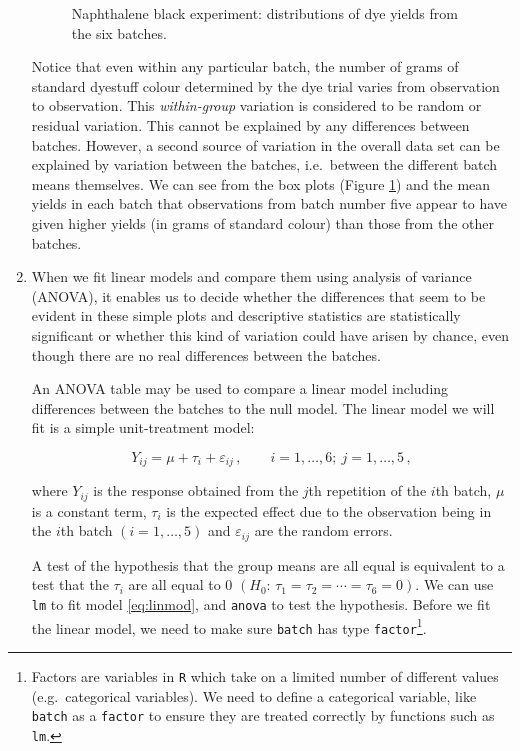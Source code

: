 \documentclass[
]{book}
\theoremstyle{definition}
\theoremstyle{definition}
\theoremstyle{definition}
\theoremstyle{definition}
\theoremstyle{remark}
\begin{document}
\begin{enumerate}
\begin{figure}
{   }

   \caption{Naphthalene black experiment: distributions of dye yields from the six batches.}\label{fig:napblack-summary}
   \end{figure}

  Notice that even within any particular batch, the number of grams of standard dyestuff colour determined by the dye trial varies from observation to observation. This \emph{within-group} variation is considered to be random or residual variation. This cannot be explained by any differences between batches. However, a second source of variation in the overall data set can be explained by variation between the batches, i.e.~between the different batch means themselves. We can see from the box plots (Figure \ref{fig:napblack-summary}) and the mean yields in each batch that observations from batch number five appear to have given higher yields (in grams of standard colour) than those from the other batches.
\item
  When we fit linear models and compare them using analysis of variance (ANOVA), it enables us to decide whether the differences that seem to be evident in these simple plots and descriptive statistics are statistically significant or whether this kind of variation could have arisen by chance, even though there are no real differences between the batches.

  An ANOVA table may be used to compare a linear model including differences between the batches to the null model. The linear model we will fit is a simple unit-treatment model:

  \begin{equation}
   Y_{ij} =  \mu +  \tau_i +  \varepsilon_{ij} \,,\qquad i=1,\ldots,6;~j=1,\ldots,5\,,
   \label{eq:linmod}
   \end{equation}

  where \(Y_{ij}\) is the response obtained from the \(j\)th repetition of the \(i\)th batch, \(\mu\) is a constant term, \(\tau_i\) is the expected effect due to the observation being in the \(i\)th batch \((i=1,\ldots,5)\) and \(\varepsilon_{ij}\) are the random errors.

  A test of the hypothesis that the group means are all equal is equivalent to a test that the \(\tau_i\) are all equal to 0 \((H_0:\, \tau_1 = \tau_2 = \cdots = \tau_6 = 0)\). We can use \texttt{lm} to fit model \eqref{eq:linmod}, and \texttt{anova} to test the hypothesis. Before we fit the linear model, we need to make sure \texttt{batch} has type \texttt{factor}\footnote{Factors are variables in \texttt{R} which take on a limited number of different values (e.g.~categorical variables). We need to define a categorical variable, like \texttt{batch} as a \texttt{factor} to ensure they are treated correctly by functions such as \texttt{lm}.}.


\end{enumerate}
\end{document}
